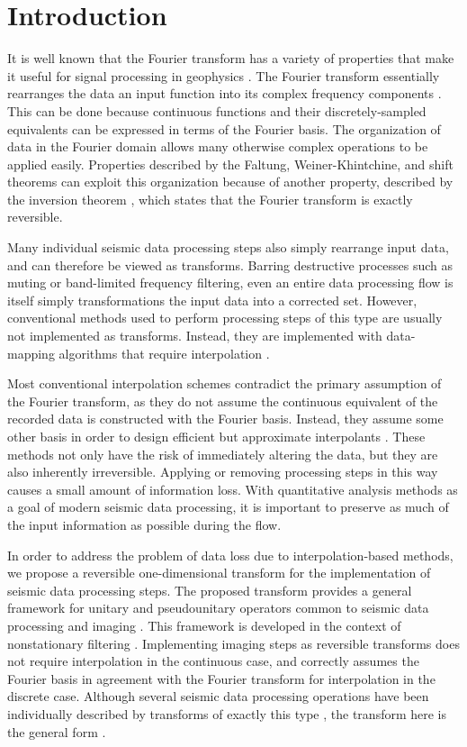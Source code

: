 \section{Introduction}
It is well known that the Fourier transform has a variety of properties that make it useful for signal processing in geophysics \citep{yilmaz01}.
The Fourier transform essentially rearranges the data an input function into its complex frequency components \citep{karl89}.
This can be done because continuous functions and their discretely-sampled equivalents can be expressed in terms of the Fourier basis.
The organization of data in the Fourier domain allows many otherwise complex operations to be applied easily.
Properties described by the Faltung, Weiner-Khintchine, and shift theorems \citep{sneddon95} can exploit this organization because of another property, described by the inversion theorem \citep{sneddon95}, which states that the Fourier transform is exactly reversible.   

Many individual seismic data processing steps also simply rearrange input data, and can therefore be viewed as transforms.
Barring destructive processes such as muting or band-limited frequency filtering, even an entire data processing flow is itself simply transformations the input data into a corrected set.
However, conventional methods used to perform processing steps of this type are usually not implemented as transforms.
Instead, they are implemented with data-mapping algorithms that require interpolation \citep{harlan82}.

Most conventional interpolation schemes contradict the primary assumption of the Fourier transform, as they do not assume the continuous equivalent of the recorded data is constructed with the Fourier basis.
Instead, they assume some other basis in order to design efficient but approximate interpolants \cite[]{karl89}.
These methods not only have the risk of immediately altering the data, but they are also inherently irreversible.
Applying or removing processing steps in this way causes a small amount of information loss.
With quantitative analysis methods as a goal of modern seismic data processing, it is important to preserve as much of the input information as possible during the flow.    

In order to address the problem of data loss due to interpolation-based methods, we propose a reversible one-dimensional transform for the implementation of seismic data processing steps.  
The proposed transform provides a general framework for unitary and pseudounitary operators common to seismic data processing and imaging \citep{biondi_claerbout85,claerbout92}.  This framework is developed in the context of nonstationary filtering \citep{margrave98}.
Implementing imaging steps as reversible transforms does not require interpolation in the continuous case, and correctly assumes the Fourier basis in agreement with the Fourier transform for interpolation in the discrete case. Although several seismic data processing operations have been individually described by transforms of exactly this type \citep{margrave98,margrave_ferguson99,margrave01,claerbout92}, the transform here is the general form \citep{burnett07,burnett_ferguson08b}.

